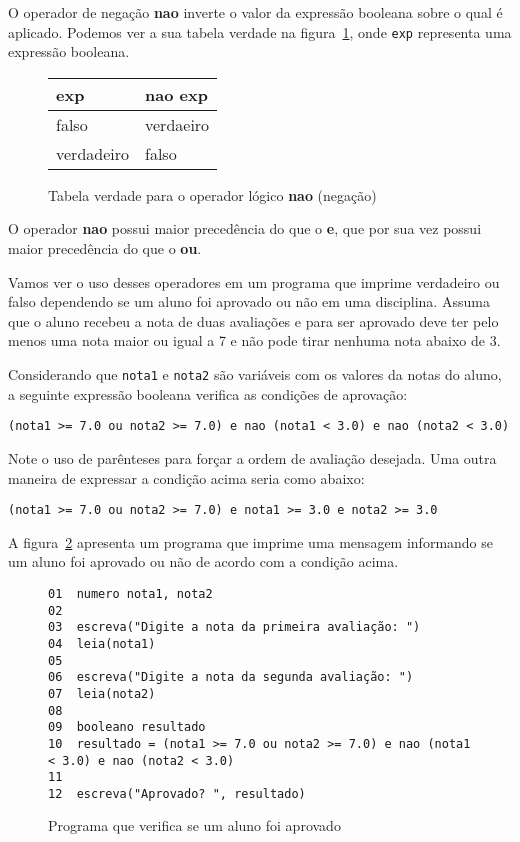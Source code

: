 \documentclass{report}
\begin{document}
O operador de negação \textbf{nao} inverte o valor da
expressão booleana sobre o qual é aplicado. Podemos
ver a sua tabela verdade na figura~\ref{tab:opnao},
onde \texttt{exp} representa uma expressão booleana.
\begin{figure}
\centering
\begin{tabular}{|l|l|}
\hline
exp & {\bf nao} exp  \\ \hline
falso & verdaeiro \\ \hline
verdadeiro & falso  \\ \hline
\end{tabular}
\label{tab:opnao}
\caption{Tabela verdade para o operador lógico {\bf nao} (negação)}
\end{figure}

O operador \textbf{nao} possui maior precedência do
que o \textbf{e}, que por sua vez possui maior precedência
do que o \textbf{ou}.

Vamos ver o uso desses operadores em um programa que imprime
verdadeiro ou falso dependendo se um aluno foi aprovado ou não
em uma disciplina. Assuma que o aluno recebeu a nota de duas
avaliações e para ser aprovado deve ter pelo menos uma nota
maior ou igual a 7 e não pode tirar nenhuma nota abaixo de 3.

Considerando que \texttt{nota1} e \texttt{nota2} são variáveis
com os valores da notas do aluno, a seguinte expressão booleana
verifica as condições de aprovação:
\begin{verbatim}
(nota1 >= 7.0 ou nota2 >= 7.0) e nao (nota1 < 3.0) e nao (nota2 < 3.0)
\end{verbatim} 
 
Note o uso de parênteses para forçar a ordem de avaliação desejada.
Uma outra maneira de expressar a condição acima seria como abaixo:
\begin{verbatim}
(nota1 >= 7.0 ou nota2 >= 7.0) e nota1 >= 3.0 e nota2 >= 3.0
\end{verbatim}

A figura~\ref{fig:aprovado} apresenta um programa que imprime
uma mensagem informando se um aluno foi aprovado ou não de
acordo com a condição acima.

\begin{figure}
{\small
\begin{verbatim}
01  numero nota1, nota2
02
03  escreva("Digite a nota da primeira avaliação: ")
04  leia(nota1)
05
06  escreva("Digite a nota da segunda avaliação: ")
07  leia(nota2)
08
09  booleano resultado
10  resultado = (nota1 >= 7.0 ou nota2 >= 7.0) e nao (nota1 < 3.0) e nao (nota2 < 3.0)
11
12  escreva("Aprovado? ", resultado) 
\end{verbatim}
\caption{Programa que verifica se um aluno foi aprovado}
\label{fig:aprovado}
}
\end{figure}
\end{document}
